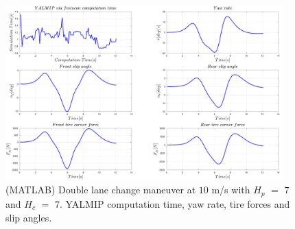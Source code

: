 \documentclass[12pt]{article}
\begin{document}
\begin{figure}[!hb]
	\centering
	\includegraphics[width=0.95\textwidth,keepaspectratio]{images/Double_Lane_Change_Maneuver_MATLAB_02.pdf}
	\caption{(MATLAB) Double lane change maneuver at $10$ m/s with $H_p$ $=$ $7$ and $H_c$ $=$ $7$. YALMIP computation time, yaw rate, tire forces and slip angles.}
	\label{fig_09:double_lane_change_maneuver_02}
\end{figure}
\end{document}
